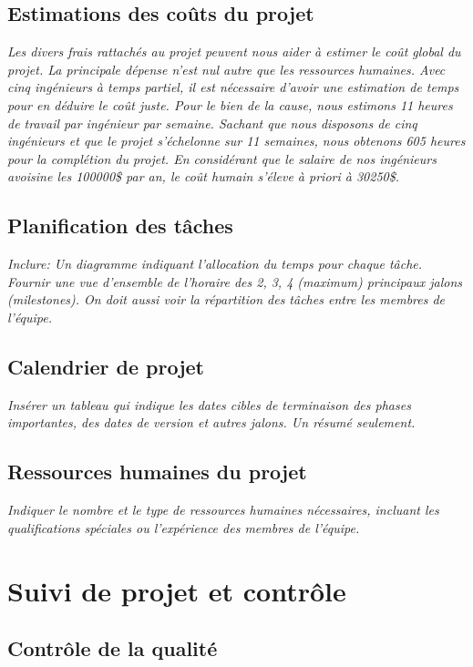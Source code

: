 \documentclass{mistcoursedoc}
\begin{document}
\subsection{Estimations des coûts du projet}

\textit{Les divers frais rattachés au projet peuvent nous aider à estimer le coût global du projet. La principale dépense n’est nul autre que les ressources humaines. Avec cinq ingénieurs à temps partiel, il est nécessaire d’avoir une estimation de temps pour en déduire le coût juste. Pour le bien de la cause, nous estimons 11 heures de travail par ingénieur par semaine. Sachant que nous disposons de cinq ingénieurs et que le projet s’échelonne sur 11 semaines, nous obtenons 605 heures pour la complétion du projet. En considérant que le salaire de nos ingénieurs avoisine les 100000\$ par an, le coût humain s’éleve à priori à 30250\$.}

\subsection{Planification des tâches}

\textit{Inclure: Un diagramme  indiquant l’allocation du temps pour chaque tâche. Fournir une vue d’ensemble de l’horaire des 2, 3, 4 (maximum) principaux jalons (milestones).  On doit aussi voir la répartition des tâches entre les membres de l’équipe.}

\subsection{Calendrier de projet}

\textit{Insérer un tableau qui indique les dates cibles de terminaison des phases importantes, des dates de version et autres jalons.  Un résumé seulement.}

\subsection{Ressources humaines du projet}

\textit{Indiquer le nombre et le type de ressources humaines nécessaires, incluant les qualifications spéciales ou l’expérience des membres de l’équipe.}

\section{Suivi de projet et contrôle}

\subsection{Contrôle de la qualité}
\end{document}
